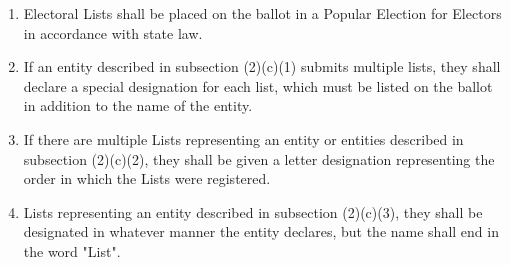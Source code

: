 \documentclass{article}
\begin{document}
    \begin{enumerate}
        \item Electoral Lists shall be placed on the ballot in a Popular Election for Electors in accordance with state law.
        \item If an entity described in subsection (2)(c)(1) submits multiple lists, they shall declare a special designation for each list, which must be listed on the ballot in addition to the name of the entity.
        \item If there are multiple Lists representing an entity or entities described in subsection (2)(c)(2), they shall be given a letter designation representing the order in which the Lists were registered.
        \item Lists representing an entity described in subsection (2)(c)(3), they shall be designated in whatever manner the entity declares, but the name shall end in the word "List". 
    \end{enumerate}
\end{document}
